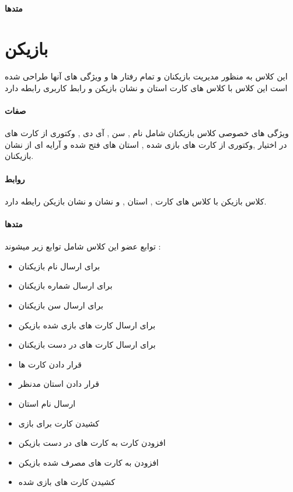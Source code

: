 \documentclass[pdf,titlepage,a4paper]{report}
\begin{document}
	\paragraph{متدها}
	
	\section{بازیکن}
	این کلاس به منظور مدیریت بازیکنان و تمام رفتار ها و ویژگی های آنها طراحی شده است 
	 این کلاس با کلاس های کارت استان و نشان بازیکن و رابط کاربری رابطه دارد
	\paragraph{صفات}
	ویژگی های خصوصی کلاس بازیکنان شامل نام , سن , آی دی , وکتوری از کارت های در اختیار ,وکتوری از کارت های بازی شده , استان های فتح شده و آرایه ای از نشان بازیکنان.
	\paragraph{روابط}
	کلاس بازیکن با کلاس های کارت , استان , و نشان و نشان بازیکن رایطه دارد.\\
	
	\paragraph{متدها}
	توابع عضو این کلاس شامل توابع زیر میشوند :
	
	\begin{itemize}
		\item {} برای ارسال نام بازیکنان
		\item {} برای ارسال شماره بازیکنان
		\item {}  برای ارسال سن بازیکنان
		\item {} برای ارسال کارت های بازی شده بازیکن
		\item {} برای ارسال کارت های در دست بازیکنان
		\item {} قرار دادن کارت ها
		\item {} قرار دادن استان مدنظر
		\item {} ارسال نام استان
		\item {} کشیدن کارت برای بازی 
		\item {} افزودن کارت به کارت های در دست بازیکن
		\item {} افزودن به کارت های مصرف شده بازیکن
		\item {} کشیدن کارت های بازی شده
	\end{itemize}
	
\end{document}
